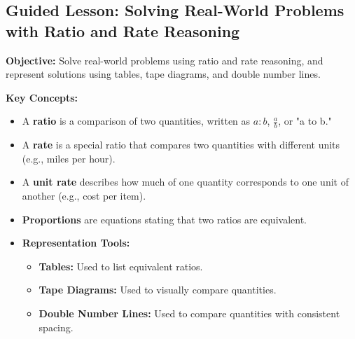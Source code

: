 \documentclass[12pt]{article}
\title{}
\date{}
\begin{document}
\subsection*{Guided Lesson: Solving Real-World Problems with Ratio and Rate Reasoning}
\onehalfspacing

\begin{tcolorbox}[colframe=black!40, colback=gray!5, 
coltitle=black, colbacktitle=black!20, fonttitle=\bfseries\Large, 
title=Learning Objective, halign title=center, left=5pt, right=5pt, top=5pt, bottom=15pt]
\textbf{Objective:} Solve real-world problems using ratio and rate reasoning, and represent solutions using tables, tape diagrams, and double number lines.
\end{tcolorbox}

\vspace{1em}

\begin{tcolorbox}[colframe=black!60, colback=white, 
coltitle=black, colbacktitle=black!15, fonttitle=\bfseries\Large, 
title=Key Concepts and Vocabulary, halign title=center, left=10pt, right=10pt, top=10pt, bottom=15pt]
\textbf{Key Concepts:}
\begin{itemize}
    \item A \textbf{ratio} is a comparison of two quantities, written as \( a:b \), \( \frac{a}{b} \), or "a to b."
    \item A \textbf{rate} is a special ratio that compares two quantities with different units (e.g., miles per hour).
    \item A \textbf{unit rate} describes how much of one quantity corresponds to one unit of another (e.g., cost per item).
    \item \textbf{Proportions} are equations stating that two ratios are equivalent.
    \item \textbf{Representation Tools:}
    \begin{itemize}
        \item \textbf{Tables:} Used to list equivalent ratios.
        \item \textbf{Tape Diagrams:} Used to visually compare quantities.
        \item \textbf{Double Number Lines:} Used to compare quantities with consistent spacing.
    \end{itemize}
\end{itemize}
\end{tcolorbox}
\end{document}
